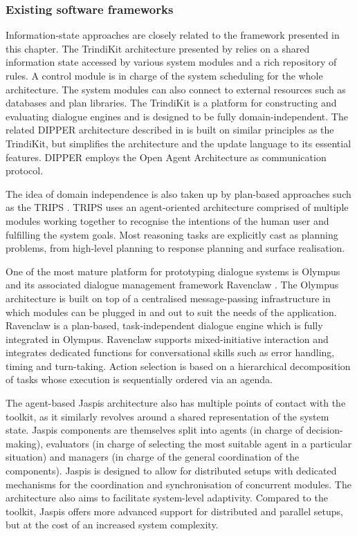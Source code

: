 \subsubsection*{Existing software frameworks}

Information-state approaches are closely related to the framework presented in this chapter. The TrindiKit architecture presented by \cite{Larsson:2000} relies on a shared information state accessed by various system modules and a rich repository of rules. A control module is in charge of the system scheduling for the whole architecture. The system modules can also connect to external resources such as databases and plan libraries.   The TrindiKit is a platform for constructing and evaluating dialogue engines and is designed to be fully domain-independent. The related DIPPER architecture described in \citep{Bos2003} is built on similar principles as the TrindiKit, but simplifies the architecture and the update language to its essential features.  DIPPER employs the Open Agent Architecture as communication protocol.

The idea of domain independence is also taken up by plan-based approaches such as the TRIPS \citep[The Rochester Interactive Planning System, cf. ][]{Allen:2000:AGD:973935.973937}. TRIPS uses an agent-oriented architecture comprised of multiple modules working together to recognise the intentions of the human user and fulfilling the system goals.  Most reasoning tasks are explicitly cast as planning problems, from high-level planning to response planning and surface realisation.  

One of the most mature platform for prototyping dialogue systems is Olympus and its associated dialogue management framework Ravenclaw \citep{Bohus:2007,Bohus:2009}.  The Olympus architecture is built on top of a centralised message-passing infrastructure in which modules can be plugged in and out to suit the needs of the application.  Ravenclaw is a plan-based, task-independent dialogue engine which is fully integrated in Olympus.  Ravenclaw supports mixed-initiative interaction and integrates dedicated functions for conversational skills such as error handling, timing and turn-taking. Action selection is based on a hierarchical decomposition of tasks whose execution is sequentially ordered via an agenda. 

The agent-based Jaspis architecture \citep{jaspis2004} also has multiple points of contact with the \opendial toolkit, as it similarly revolves around a shared representation of the system state.  Jaspis components are themselves split into agents (in charge of decision-making), evaluators (in charge of selecting the most suitable agent in a particular situation) and managers (in charge of the general coordination of the components). Jaspis is designed to allow for distributed setups with dedicated mechanisms for the coordination and synchronisation of concurrent modules.  The architecture also aims to facilitate system-level adaptivity.  Compared to the \opendial toolkit, Jaspis offers more advanced support for distributed and parallel setups, but at the cost of an increased system complexity.  

